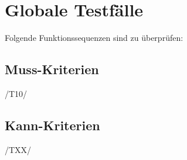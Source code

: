 \chapter{Globale Testfälle}
Folgende Funktionssequenzen sind zu überprüfen: 
\section{Muss-Kriterien}
\begin{description}
\item[/T10/] 
\end{description}

\section{Kann-Kriterien}
\begin{description}
\item[/TXX/] 
\end{description}
